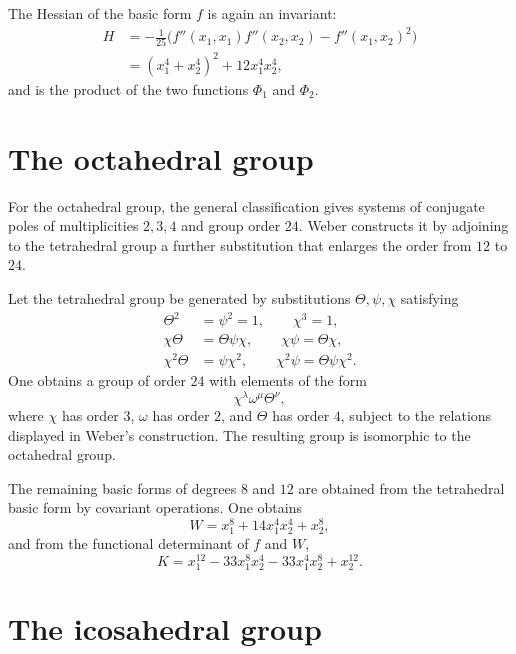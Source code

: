 \documentclass[11pt,a4paper]{book}
\begin{document}
The Hessian of the basic form $f$ is again an invariant:
\begin{align*}
 H&=-\frac1{25}\bigl(f''(x_1,x_1)f''(x_2,x_2)-f''(x_1,x_2)^2\bigr)\\
  &=(x_1^4+x_2^4)^2+12x_1^4x_2^4,
\end{align*}
and is the product of the two functions $\Phi_1$ and $\Phi_2$.

\section{The octahedral group}

For the octahedral group, the general classification gives systems of conjugate poles of multiplicities $2,3,4$ and group order $24$.  Weber constructs it by adjoining to the tetrahedral group a further substitution that enlarges the order from $12$ to $24$.

Let the tetrahedral group be generated by substitutions $\Theta,\psi,\chi$ satisfying
\begin{equation}\label{eq:w9-oct-rel}
\begin{aligned}
 \Theta^2&=\psi^2=1,
 \qquad \chi^3=1,\\
 \chi\Theta&=\Theta\psi\chi,
 \qquad \chi\psi=\Theta\chi,\\
 \chi^2\Theta&=\psi\chi^2,
 \qquad \chi^2\psi=\Theta\psi\chi^2.
\end{aligned}
\end{equation}
One obtains a group of order $24$ with elements of the form
\[
 \chi^\lambda\omega^\mu\Theta^\nu,
\]
where $\chi$ has order $3$, $\omega$ has order $2$, and $\Theta$ has order $4$, subject to the relations displayed in Weber's construction.  The resulting group is isomorphic to the octahedral group.

The remaining basic forms of degrees $8$ and $12$ are obtained from the tetrahedral basic form by covariant operations.  One obtains
\begin{equation}\label{eq:w9-oct-W}
 W=x_1^8+14x_1^4x_2^4+x_2^8,
\end{equation}
and from the functional determinant of $f$ and $W$,
\begin{equation}\label{eq:w9-oct-K}
 K=x_1^{12}-33x_1^8x_2^4-33x_1^4x_2^8+x_2^{12}.
\end{equation}

\section{The icosahedral group}
\end{document}
